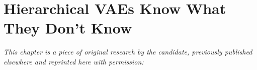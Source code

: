 
\chapter[hierarchical vaes know what they don't know]{Hierarchical VAEs Know What They Don't Know}
\label{chp:paper-hierarchical}

\textit{This chapter is a piece of original research by the candidate, previously published elsewhere and reprinted here with permission:} \newline
\begin{center}
    \begin{enumerate}[leftmargin=8mm,rightmargin=8mm,topsep=0mm,label={[\Alph*]}]
        \setcounter{enumi}{0}
        \item {} \main \hspace{0.1em} \parencite{havtorn_hierarchical_2021}
        \end{enumerate}
\end{center}

